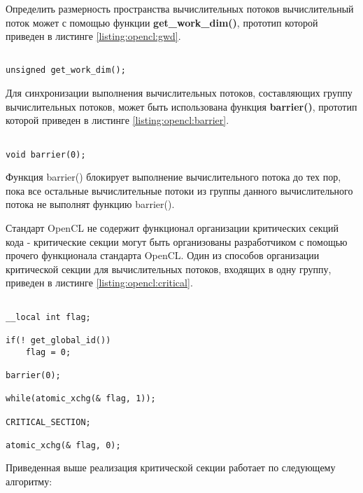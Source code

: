 		Определить размерность пространства вычислительных потоков вычислительный поток может с помощью функции {\bf get\_work\_dim()}, прототип которой приведен в листинге \ref{listing:opencl:gwd}.

\begin{lstlisting}

unsigned get_work_dim();

\end{lstlisting}
\mylistingend


		Для синхронизации выполнения вычислительных потоков, составляющих группу вычислительных потоков, может быть использована функция {\bf barrier()}, прототип которой приведен в листинге \ref{listing:opencl:barrier}.

\begin{lstlisting}

void barrier(0);

\end{lstlisting}
\mylistingend

		Функция barrier() блокирует выполнение вычислительного потока до тех пор, пока все остальные вычислительные потоки из группы данного вычислительного потока не выполнят функцию barrier().

		Стандарт OpenCL не содержит функционал организации критических секций кода - критические секции могут быть организованы разработчиком с помощью прочего функционала стандарта OpenCL. Один из способов организации критической секции для вычислительных потоков, входящих в одну группу, приведен в листинге \ref{listing:opencl:critical}.

\begin{lstlisting}

__local int flag;

if(! get_global_id())
	flag = 0;

barrier(0);

while(atomic_xchg(& flag, 1));

CRITICAL_SECTION;

atomic_xchg(& flag, 0);

\end{lstlisting}
\mylistingend

	Приведенная выше реализация критической секции работает по следующему алгоритму:

